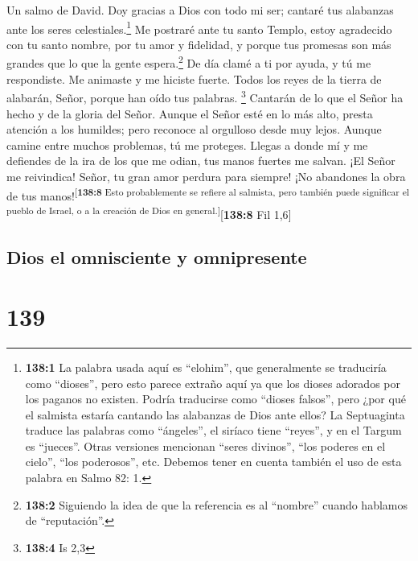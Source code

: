 Un salmo de David.  Doy gracias a Dios con todo mi ser;
cantaré tus alabanzas ante los seres celestiales.\footnote{\textbf{138:1}
  La palabra usada aquí es ``elohim'', que generalmente se traduciría
  como ``dioses'', pero esto parece extraño aquí ya que los dioses
  adorados por los paganos no existen. Podría traducirse como ``dioses
  falsos'', pero ¿por qué el salmista estaría cantando las alabanzas de
  Dios ante ellos? La Septuaginta traduce las palabras como ``ángeles'',
  el siríaco tiene ``reyes'', y en el Targum es ``jueces''. Otras
  versiones mencionan ``seres divinos'', ``los poderes en el cielo'',
  ``los poderosos'', etc. Debemos tener en cuenta también el uso de esta
  palabra en Salmo 82: 1.}  Me postraré ante tu santo
Templo, estoy agradecido con tu santo nombre, por tu amor y fidelidad, y
porque tus promesas son más grandes que lo que la gente
espera.\footnote{\textbf{138:2} Siguiendo la idea de que la referencia
  es al ``nombre'' cuando hablamos de ``reputación''.}  De
día clamé a ti por ayuda, y tú me respondiste. Me animaste y me hiciste
fuerte.  Todos los reyes de la tierra de alabarán, Señor,
porque han oído tus palabras. \footnote{\textbf{138:4} Is 2,3}
 Cantarán de lo que el Señor ha hecho y de la gloria del
Señor.  Aunque el Señor esté en lo más alto, presta
atención a los humildes; pero reconoce al orgulloso desde muy lejos.
 Aunque camine entre muchos problemas, tú me proteges.
Llegas a donde mí y me defiendes de la ira de los que me odian, tus
manos fuertes me salvan.  ¡El Señor me reivindica! Señor,
tu gran amor perdura para siempre! ¡No abandones la obra de tus
manos!\textsuperscript{{[}\textbf{138:8} Esto probablemente se refiere
al salmista, pero también puede significar el pueblo de Israel, o a la
creación de Dios en general.{]}}{[}\textbf{138:8} Fil 1,6{]}

\hypertarget{dios-el-omnisciente-y-omnipresente}{%
\subsection{Dios el omnisciente y
omnipresente}\label{dios-el-omnisciente-y-omnipresente}}

\hypertarget{section-138}{%
\section{139}\label{section-138}}

